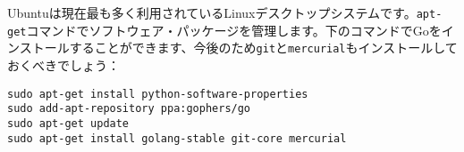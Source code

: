 Ubuntuは現在最も多く利用されているLinuxデスクトップシステムです。\texttt{apt-get}コマンドでソフトウェア・パッケージを管理します。下のコマンドでGoをインストールすることができます、今後のため\texttt{git}と\texttt{mercurial}もインストールしておくべきでしょう：

\begin{lstlisting}[numbers=none]
sudo apt-get install python-software-properties
sudo add-apt-repository ppa:gophers/go
sudo apt-get update
sudo apt-get install golang-stable git-core mercurial
\end{lstlisting}
